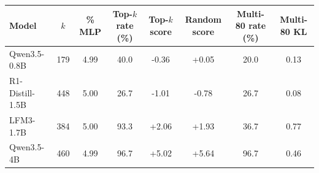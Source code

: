 \begin{tabular}{lccccccc}
\toprule
Model & $k$ & \% MLP & Top-$k$ rate (\%) & Top-$k$ score & Random score & Multi-80 rate (\%) & Multi-80 KL \\
\midrule
Qwen3.5-0.8B & 179 & 4.99 & 40.0 & -0.36 & +0.05 & 20.0 & 0.13 \\
R1-Distill-1.5B & 448 & 5.00 & 26.7 & -1.01 & -0.78 & 26.7 & 0.08 \\
LFM3-1.7B & 384 & 5.00 & 93.3 & +2.06 & +1.93 & 36.7 & 0.77 \\
Qwen3.5-4B & 460 & 4.99 & 96.7 & +5.02 & +5.64 & 96.7 & 0.46 \\
\bottomrule
\end{tabular}